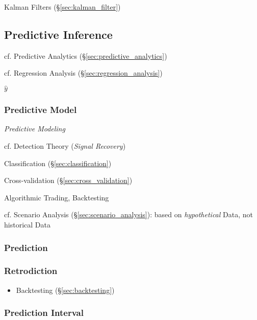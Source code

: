 \fist Kalman Filters (\S\ref{sec:kalman_filter})



\subsection{Predictive Inference}\label{sec:predictive_inference}

cf. Predictive Analytics (\S\ref{sec:predictive_analytics})

\fist cf. Regression Analysis (\S\ref{sec:regression_analysis})

$\hat{y}$



\subsubsection{Predictive Model}\label{sec:predictive_model}

\emph{Predictive Modeling}

cf. Detection Theory (\emph{Signal Recovery}) %

Classification (\S\ref{sec:classification})

Cross-validation (\S\ref{sec:cross_validation})

Algorithmic Trading, Backtesting

cf. Scenario Analysis (\S\ref{sec:scenario_analysis}): based on
\emph{hypothetical} Data, not historical Data



\subsubsection{Prediction}\label{sec:prediction}

\subsubsection{Retrodiction}\label{sec:retrodiction}

\begin{itemize}
  \item Backtesting (\S\ref{sec:backtesting})
\end{itemize}



\subsubsection{Prediction Interval}\label{sec:prediction_interval}\hfill


